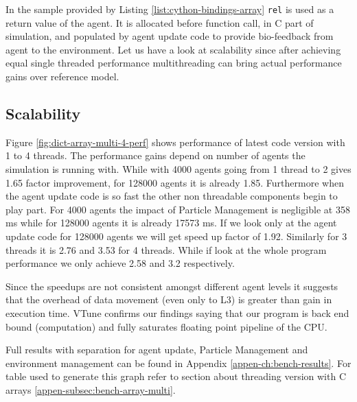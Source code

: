 \documentclass[12pt, a4paper]{report}
\begin{document}
In the sample provided by Listing \ref{list:cython-bindings-array}
\lstinline{rel} is used as a return value of the agent. It is allocated before
function call, in C part of simulation, and populated by agent update code to
provide bio-feedback from agent to the environment. Let us have a look at scalability
since after achieving equal single threaded performance multithreading can bring
actual performance gains over reference model.

\subsection{Scalability}\label{subsec:embed-array-scala}
Figure \ref{fig:dict-array-multi-4-perf} shows performance of latest code version
with 1 to 4 threads. The performance gains depend on number of agents the simulation
is running with. While with 4000 agents going from 1 thread to 2 gives 1.65 factor
improvement, for 128000 agents it is already 1.85. Furthermore when the agent update
code is so fast the other non threadable components begin to play part. For 4000 agents
the impact of Particle Management is negligible at 358 ms while for 128000 agents it
is already 17573 ms. If we look only at the agent update code for 128000 agents we
will get speed up factor of 1.92. Similarly for 3 threads it is 2.76 and 3.53 for 4
threads. While if look at the whole program performance we only achieve 2.58 and 3.2 respectively.

Since the speedups are not consistent amongst different agent levels it suggests that
the overhead of data movement (even only to L3) is greater than gain in execution time.
VTune confirms our findings saying that our program is back end bound (computation) and
fully saturates floating point pipeline of the CPU.

Full results with separation for agent update, Particle Management and environment management
can be found in Appendix \ref{appen-ch:bench-results}. For table used to generate this graph refer
to section about threading version with C arrays \ref{appen-subsec:bench-array-multi}.
\end{document}
